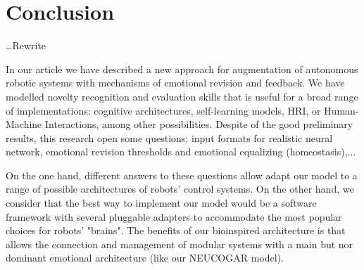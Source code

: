 \documentclass[oribibl]{llncs}
\begin{document}
\section{Conclusion}\label{conclusion}

\ldots Rewrite

In our article we have described a new approach for augmentation of autonomous robotic systems with mechanisms of emotional revision and
feedback. We have modelled novelty recognition and evaluation skills that is useful for a broad range of implementations: cognitive architectures,
self-learning models, HRI, or Human-Machine Interactions, among other possibilities.
Despite of the good preliminary results, this research open some questions: input formats for realistic
neural network, emotional revision thresholds and emotional equalizing (homeostasis),...

On the one hand, different answers to these questions allow adapt our  model to a range of possible architectures of robots' control systems. On the other hand, we consider that the best way to implement our model would be a software framework with several pluggable adapters to accommodate the most popular choices for robots' "brains". The benefits of our bioinspired architecture is that allows the connection and management of modular systems with a main but nor dominant emotional architecture (like our NEUCOGAR model).


\end{document}
